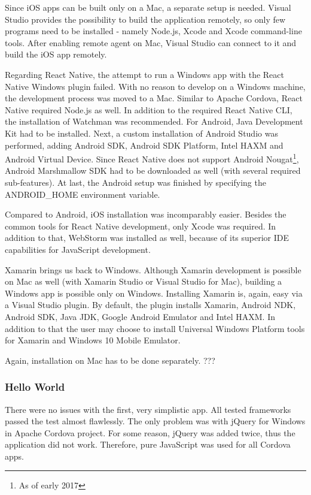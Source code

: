\documentclass[english,master,public,dept460,male,cpdeclaration,oneside]{diploma}
\begin{document}
Since iOS apps can be built only on a Mac, a separate setup is needed. Visual Studio provides the possibility to build the application remotely, so only few programs need to be installed - namely Node.js, Xcode and Xcode command-line tools. After enabling remote agent on Mac, Visual Studio can connect to it and build the iOS app remotely.

Regarding React Native, the attempt to run a Windows app with the React Native Windows plugin failed. With no reason to develop on a Windows machine, the development process was moved to a Mac. Similar to Apache Cordova, React Native required Node.js as well. In addition to the required React Native CLI, the installation of Watchman was recommended. For Android, Java Development Kit had to be installed. Next, a custom installation of Android Studio was performed, adding Android SDK, Android SDK Platform, Intel HAXM and Android Virtual Device. Since React Native does not support Android Nougat\footnote{As of early 2017}, Android Marshmallow SDK had to be downloaded as well (with several required sub-features). At last, the Android setup was finished by specifying the ANDROID\_HOME environment variable.

Compared to Android, iOS installation was incomparably easier. Besides the common tools for React Native development, only Xcode was required. In addition to that, WebStorm was installed as well, because of its superior IDE capabilities for JavaScript development.

Xamarin brings us back to Windows. Although Xamarin development is possible on Mac as well (with Xamarin Studio or Visual Studio for Mac), building a Windows app is possible only on Windows. Installing Xamarin is, again, easy via a Visual Studio plugin. By default, the plugin installs Xamarin, Android NDK, Android SDK, Java JDK, Google Android Emulator and Intel HAXM. In addition to that the user may choose to install Universal Windows Platform tools for Xamarin and Windows 10 Mobile Emulator. 

Again, installation on Mac has to be done separately. ???

\subsubsection{Hello World}
There were no issues with the first, very simplistic app. All tested frameworks passed the test almost flawlessly. The only problem was with jQuery for Windows in Apache Cordova project. For some reason, jQuery was added twice, thus the application did not work. Therefore, pure JavaScript was used for all Cordova apps.
\end{document}
